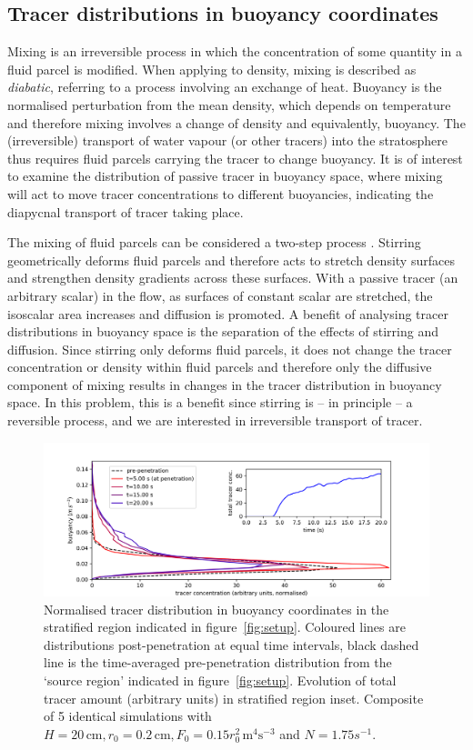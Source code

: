 \documentclass[a4paper]{article}
\begin{document}
\subsection{Tracer distributions in buoyancy coordinates}
\label{sec:distributions}

Mixing is an irreversible process in which the concentration of some quantity in a fluid parcel is modified.
When applying to density, mixing is described as \emph{diabatic}, referring to a process involving an exchange
of heat. Buoyancy is the normalised perturbation from the mean density, which depends on temperature and
therefore mixing involves a change of density and equivalently, buoyancy. The (irreversible) transport of
water vapour (or other tracers) into the stratosphere thus requires fluid parcels carrying the tracer to
change buoyancy. It is of interest to examine the distribution of passive tracer in buoyancy space, where
mixing will act to move tracer concentrations to different buoyancies, indicating the diapycnal transport of
tracer taking place. 

The mixing of fluid parcels can be considered a two-step process \citep{wykes2014}. Stirring
geometrically deforms fluid parcels and therefore acts to stretch density surfaces and strengthen density
gradients across these surfaces. With a passive tracer (an arbitrary scalar) in the flow, as surfaces of
constant scalar are stretched, the isoscalar area increases and diffusion is promoted. A benefit of analysing
tracer distributions in buoyancy space is the separation of the effects of stirring and diffusion. Since
stirring only deforms fluid parcels, it does not change the tracer concentration or density within fluid
parcels and therefore only the diffusive component of mixing results in changes in the tracer distribution in
buoyancy space. In this problem, this is a benefit since stirring is -- in principle -- a reversible process,
and we are interested in irreversible transport of tracer.

\begin{figure}
	\centering
	\includegraphics[width=.6\textwidth]{tb_dist}
	\caption{Normalised tracer distribution in buoyancy coordinates in the stratified region indicated in
		figure~\ref{fig:setup}. Coloured lines are distributions post-penetration at equal time intervals,
		black dashed line is the time-averaged pre-penetration distribution from the `source region' indicated
		in figure~\ref{fig:setup}. Evolution of total tracer amount (arbitrary units) in stratified region 
		inset. Composite of 5 identical simulations with $H = 20\,\mathrm{cm}, r_0 = 0.2 \, \mathrm{cm}, F_0 =
		0.15r_0^2 \, \mathrm{m}^4 \mathrm{s}^{-3}$ and $N = 1.75 s^{-1}$.}
	\label{fig:tbdist}
\end{figure}
\end{document}
